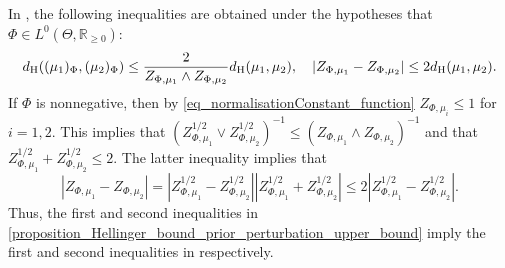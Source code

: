 \documentclass[a4paper]{scrartcl}
\theoremstyle{definition}
\numberwithin{equation}{section}
\newcommand{\R}{\mathbb{R}}
\newcommand{\Abs}[1]{\left\vert#1\right\vert}
\newcommand{\Hel}[0]{\textup{H}}
\begin{document}
In \cite[Theorem 7]{Sprungk2020}, the following inequalities are obtained under the hypotheses that $\Phi\in L^0(\Theta,\R_{\geq 0})$:
\begin{equation*}
 d_{\Hel}((\mu_1)_\Phi,(\mu_2)_\Phi)\leq \frac{2}{Z_{\Phi,\mu_1}\wedge Z_{\Phi,\mu_2}}d_{\Hel}(\mu_1,\mu_2),\quad \Abs{ Z_{\Phi,\mu_1}- Z_{\Phi,\mu_2}}\leq 2d_{\Hel}(\mu_1,\mu_2).
\end{equation*}
If $\Phi$ is nonnegative, then by \eqref{eq_normalisationConstant_function} $Z_{\Phi,\mu_i}\leq 1$ for $i=1,2$.
This implies that $(Z_{\Phi,\mu_1}^{1/2}\vee Z_{\Phi,\mu_2}^{1/2})^{-1}\leq (Z_{\Phi,\mu_1}\wedge Z_{\Phi,\mu_2})^{-1}$ and that $Z_{\Phi,\mu_1}^{1/2}+Z_{\Phi,\mu_2}^{1/2}\leq 2$.
The latter inequality implies that 
\begin{equation*}
 \Abs{ Z_{\Phi,\mu_1}- Z_{\Phi,\mu_2}}=\Abs{ Z_{\Phi,\mu_1}^{1/2}- Z_{\Phi,\mu_2}^{1/2}}\Abs{Z_{\Phi,\mu_1}^{1/2}+Z_{\Phi,\mu_2}^{1/2}}\leq 2 \Abs{ Z_{\Phi,\mu_1}^{1/2}- Z_{\Phi,\mu_2}^{1/2}}.
\end{equation*}
Thus, the first and second inequalities in \ref{proposition_Hellinger_bound_prior_perturbation_upper_bound} imply the first and second inequalities in \cite[Theorem 7]{Sprungk2020} respectively.
\end{document}
